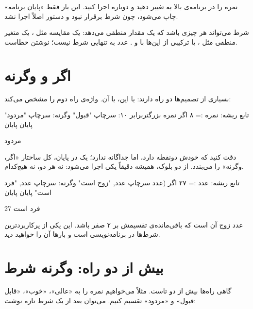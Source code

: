 نمره را در برنامه‌ی بالا به  تغییر دهید و دوباره اجرا کنید. این بار
فقط «پایان برنامه» چاپ می‌شود، چون شرط برقرار نبود و دستور  اصلاً اجرا نشد.

\begin{note}
شرط  می‌تواند هر چیزی باشد که یک مقدار منطقی می‌دهد: یک مقایسه
مثل ، یک متغیر منطقی مثل ، یا
ترکیبی از این‌ها با  و . عدد به تنهایی شرط نیست؛ نوشتن
 خطاست.
\end{note}

\section{اگر و وگرنه}

بسیاری از تصمیم‌ها دو راه دارند: یا این، یا آن. واژه‌ی  راه دوم
را مشخص می‌کند:

\begin{salamfa}
تابع ریشه:
    نمره := ۸
    اگر نمره بزرگتربرابر ۱۰:
        سرچاپ "قبول"
    وگرنه:
        سرچاپ "مردود"
    پایان
پایان
\end{salamfa}

\begin{outputfa}
مردود
\end{outputfa}

دقت کنید که  خودش دونقطه دارد، اما  جداگانه ندارد؛
یک  در پایان، کل ساختار «اگر، وگرنه» را می‌بندد. از دو بلوک،
همیشه دقیقاً یکی اجرا می‌شود: نه هر دو، نه هیچ‌کدام.

\begin{salamfa}
تابع ریشه:
    عدد := ۲۷
    اگر (عدد %
        سرچاپ عدد, "زوج است"
    وگرنه:
        سرچاپ عدد, "فرد است"
    پایان
پایان
\end{salamfa}

\begin{outputfa}
27 فرد است
\end{outputfa}

عدد زوج آن است که باقی‌مانده‌ی تقسیمش بر ۲ صفر باشد. این یکی از
پرکاربردترین شرط‌ها در برنامه‌نویسی است و بارها آن را خواهید دید.

\section{بیش از دو راه: وگرنه شرط}

گاهی راه‌ها بیش از دو تاست. مثلاً می‌خواهیم نمره را به «عالی»، «خوب»،
«قابل قبول» و «مردود» تقسیم کنیم. می‌توان بعد از  یک شرط تازه
نوشت:


